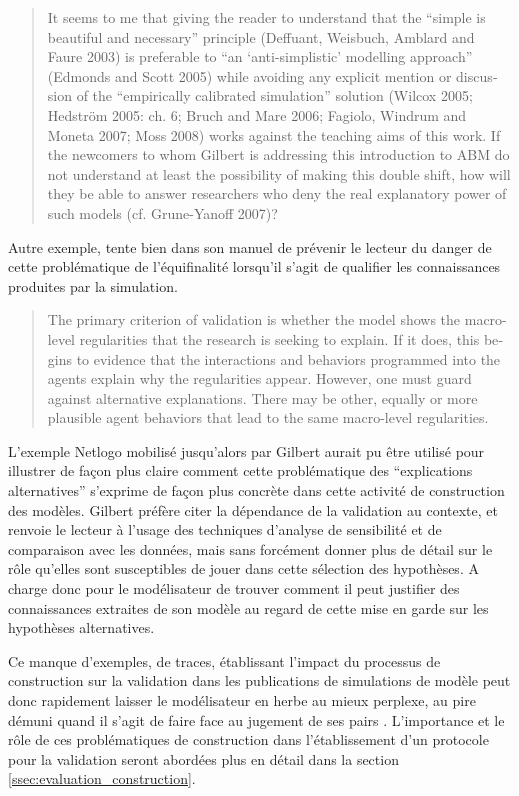 \foreignblockquote{english}[\cite{Manzo2007a}]{It seems to me that giving the reader to understand that the \enquote{simple is beautiful and necessary} principle (Deffuant, Weisbuch, Amblard and Faure 2003) is preferable to \enquote{an \enquote{anti-simplistic} modelling approach} (Edmonds and Scott 2005) while avoiding any explicit mention or discussion of the \enquote{empirically
calibrated simulation} solution (Wilcox 2005; Hedström 2005: ch. 6; Bruch and Mare 2006; Fagiolo, Windrum and Moneta 2007; Moss 2008) works against the teaching aims of this work. If the newcomers to whom Gilbert is addressing this introduction to ABM do not understand at least the possibility of making this double shift, how will they be able to answer researchers who deny the real explanatory power of such models (cf. Grune-Yanoff 2007)?}

Autre exemple, \textcite{Gilbert2008} tente bien dans son manuel de prévenir le lecteur du danger de cette problématique de l'équifinalité lorsqu'il s'agit de qualifier les connaissances produites par la simulation.

\foreignblockquote{english}[{\cite[31-32]{Gilbert2008}}]{The primary criterion of validation is whether the model shows the macro-level regularities that the research is seeking to explain. If it does, this begins to evidence that the interactions and behaviors programmed into the agents explain why the regularities appear. However, one must guard against alternative explanations. There may be other, equally or more plausible agent behaviors that lead to the same macro-level regularities.}

L'exemple Netlogo mobilisé jusqu'alors par Gilbert aurait pu être utilisé pour illustrer de façon plus claire comment cette problématique des \enquote{explications alternatives} s'exprime de façon plus concrète dans cette activité de construction des modèles. Gilbert préfère citer la dépendance de la validation au contexte, et renvoie le lecteur à l'usage des techniques d'analyse de sensibilité et de comparaison avec les données, mais sans forcément donner plus de détail sur le rôle qu'elles sont susceptibles de jouer dans cette sélection des hypothèses. A charge donc pour le modélisateur de trouver comment il peut justifier des connaissances extraites de son modèle au regard de cette mise en garde sur les hypothèses alternatives.

Ce manque d'exemples, de traces, établissant l'impact du processus de construction sur la validation dans les publications de simulations de modèle peut donc rapidement laisser le modélisateur en herbe au mieux perplexe, au pire démuni quand il s'agit de faire face au jugement de ses pairs \autocite{Manzo2007a}. L'importance et le rôle de ces problématiques de construction dans l'établissement d'un protocole pour la validation seront abordées plus en détail dans la section \ref{ssec:evaluation_construction}.

